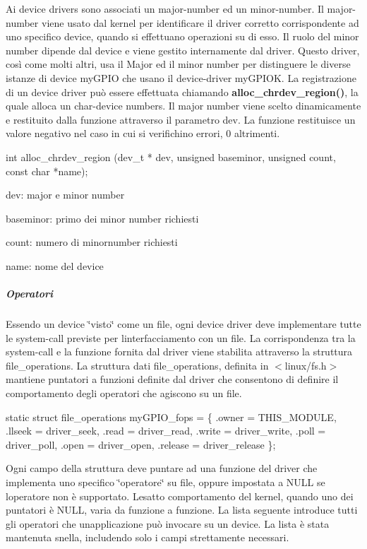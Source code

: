 Ai device drivers sono associati un major-\/number ed un minor-\/number. Il major-\/number viene usato dal kernel per identificare il driver corretto corrispondente ad uno specifico device, quando si effettuano operazioni su di esso. Il ruolo del minor number dipende dal device e viene gestito internamente dal driver. Questo driver, così come molti altri, usa il Major ed il minor number per distinguere le diverse istanze di device my\+G\+P\+IO che usano il device-\/driver my\+G\+P\+I\+OK. La registrazione di un device driver può essere effettuata chiamando {\bfseries alloc\+\_\+chrdev\+\_\+region()}, la quale alloca un char-\/device numbers. Il major number viene scelto dinamicamente e restituito dalla funzione attraverso il parametro dev. La funzione restituisce un valore negativo nel caso in cui si verifichino errori, 0 altrimenti. 
\begin{DoxyCode}
\textcolor{keywordtype}{int} alloc\_chrdev\_region (dev\_t * dev, \textcolor{keywordtype}{unsigned} baseminor, \textcolor{keywordtype}{unsigned} count, \textcolor{keyword}{const} \textcolor{keywordtype}{char} *name);
\end{DoxyCode}

\begin{DoxyItemize}
\item dev\+: major e minor number
\item baseminor\+: primo dei minor number richiesti
\item count\+: numero di minornumber richiesti
\item name\+: nome del device
\end{DoxyItemize}

\subparagraph*{Operatori}

Essendo un device \char`\"{}visto\char`\"{} come un file, ogni device driver deve implementare tutte le system-\/call previste per l\textquotesingle{}interfacciamento con un file. La corrispondenza tra la system-\/call e la funzione fornita dal driver viene stabilita attraverso la struttura file\+\_\+operations. La struttura dati file\+\_\+operations, definita in $<$linux/fs.\+h$>$ mantiene puntatori a funzioni definite dal driver che consentono di definire il comportamento degli operatori che agiscono su un file. 
\begin{DoxyCode}
\textcolor{keyword}{static} \textcolor{keyword}{struct }file\_operations myGPIO\_fops = \{
    .owner      = THIS\_MODULE,
    .llseek     = driver\_seek,
    .read       = driver\_read,
    .write      = driver\_write,
    .poll       = driver\_poll,
    .open       = driver\_open,
    .release    = driver\_release
\};
\end{DoxyCode}
 Ogni campo della struttura deve puntare ad una funzione del driver che implementa uno specifico \char`\"{}operatore\char`\"{} su file, oppure impostata a N\+U\+LL se l\textquotesingle{}operatore non è supportato. L\textquotesingle{}esatto comportamento del kernel, quando uno dei puntatori è N\+U\+LL, varia da funzione a funzione. La lista seguente introduce tutti gli operatori che un\textquotesingle{}applicazione può invocare su un device. La lista è stata mantenuta snella, includendo solo i campi strettamente necessari.


